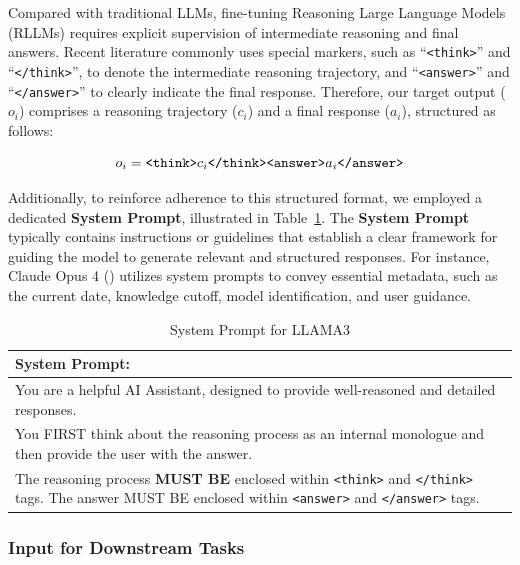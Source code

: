 Compared with traditional LLMs, fine-tuning Reasoning Large Language Models (RLLMs) requires explicit supervision of intermediate reasoning and final answers. Recent literature commonly uses special markers, such as ``\texttt{<think>}'' and ``\texttt{</think>}'', to denote the intermediate reasoning trajectory, and ``\texttt{<answer>}'' and ``\texttt{</answer>}'' to clearly indicate the final response. Therefore, our target output ($o_i$) comprises a reasoning trajectory ($c_i$) and a final response ($a_i$), structured as follows:



\begin{equation*}
    o_i = \text{\texttt{<think>}}c_i\text{\texttt{</think>}}\text{\texttt{<answer>}}a_i\text{\texttt{</answer>}}
\end{equation*}



Additionally, to reinforce adherence to this structured format, we employed a dedicated \textbf{System Prompt}, illustrated in Table~\ref{tab:ch2:system_prompt}. The \textbf{System Prompt} typically contains instructions or guidelines that establish a clear framework for guiding the model to generate relevant and structured responses. For instance, Claude Opus 4 (\cite{claude42025}) utilizes system prompts to convey essential metadata, such as the current date, knowledge cutoff, model identification, and user guidance.


\begin{table}[h]
    \centering
    \footnotesize
    \begin{tabular}{p{}}
    \toprule
    \textbf{System Prompt:} \\
    \midrule
      You are a helpful AI Assistant, designed to provide well-reasoned and detailed responses. \\
  You FIRST think about the reasoning process as an internal monologue and then provide the user with the answer.  \\
  The reasoning process \textbf{MUST BE} enclosed within \texttt{<think>} and \texttt{</think>} tags. The answer MUST BE enclosed within \texttt{<answer>} and \texttt{</answer>} tags. \\
    \bottomrule
    \end{tabular}
    \caption{System Prompt for LLAMA3}
    \label{tab:ch2:system_prompt}
\end{table}



\subsubsection*{Input for Downstream Tasks}

